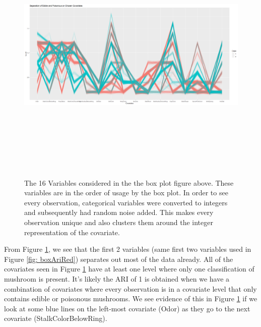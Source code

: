 \documentclass[float=false, crop=false]{standalone}
\begin{document}
\begin{figure}[H] 
		\includegraphics[width=1\textwidth, height=5in]{images/parcord.png}
		\caption{The 16 Variables considered in the the box plot figure above. These variables are in the order of usage by the box plot. In order to see every observation, categorical variables were converted to integers and subsequently had random noise added. This makes every observation unique and also clusters them around the integer representation of the covariate.}
		\label{fig: parcordRed}
\end{figure}

From Figure \ref{fig: parcordRed}, we see that the first 2 variables (same first two variables used in Figure \ref{fig: boxAriRed}) separates out most of the data already. All of the covariates seen in Figure \ref{fig: parcordRed} have at least one level where only one classification of mushroom is present. It's likely the ARI of 1 is obtained when we have a combination of covariates where every observation is in a covariate level that only contains edible or poisonous mushrooms. We see evidence of this in Figure \ref{fig: parcordRed} if we look at some blue lines on the left-most covariate (Odor) as they go to the next covariate (StalkColorBelowRing). 
\end{document}
